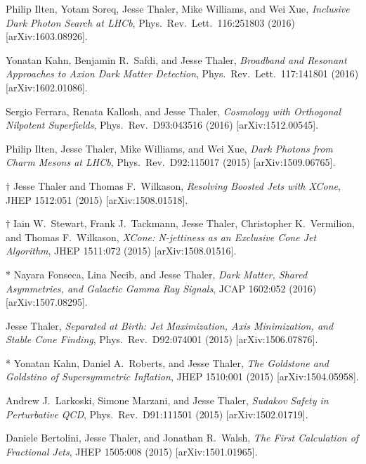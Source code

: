 \begin{list}{[]\addtocounter{jessecount}{-1}}{\leftmargin=3em \itemsep=4pt}
\item
 Philip Ilten, Yotam Soreq, Jesse Thaler, Mike Williams, and Wei Xue,
\emph{Inclusive Dark Photon Search at LHCb},
Phys.\ Rev.\ Lett.\ 116:251803 (2016)
[arXiv:1603.08926].

\item
 Yonatan Kahn, Benjamin R.\ Safdi, and Jesse Thaler,
\emph{Broadband and Resonant Approaches to Axion Dark Matter Detection},
Phys.\ Rev.\ Lett.\ 117:141801 (2016)
[arXiv:1602.01086].

\item
 Sergio Ferrara, Renata Kallosh, and Jesse Thaler,
\emph{Cosmology with Orthogonal Nilpotent Superfields},
Phys.\ Rev.\ D93:043516 (2016)
[arXiv:1512.00545].

\item
 Philip Ilten, Jesse Thaler, Mike Williams, and Wei Xue,
\emph{Dark Photons from Charm Mesons at LHCb},
Phys.\ Rev.\ D92:115017 (2015)
[arXiv:1509.06765].

\item
$\dagger$ Jesse Thaler and Thomas F.\ Wilkason,
\emph{Resolving Boosted Jets with XCone},
JHEP 1512:051 (2015)
[arXiv:1508.01518].

\item
$\dagger$ Iain W.\ Stewart, Frank J.\ Tackmann, Jesse Thaler, Christopher K.\ Vermilion, and Thomas F.\ Wilkason,
\emph{XCone: N-jettiness as an Exclusive Cone Jet Algorithm},
JHEP 1511:072 (2015)
[arXiv:1508.01516].

\item
* Nayara Fonseca, Lina Necib, and Jesse Thaler,
\emph{Dark Matter, Shared Asymmetries, and Galactic Gamma Ray Signals},
JCAP 1602:052 (2016)
[arXiv:1507.08295].

\item
 Jesse Thaler,
\emph{Separated at Birth: Jet Maximization, Axis Minimization, and Stable Cone Finding},
Phys.\ Rev.\ D92:074001 (2015)
[arXiv:1506.07876].

\item
* Yonatan Kahn, Daniel A.\ Roberts, and Jesse Thaler,
\emph{The Goldstone and Goldstino of Supersymmetric Inflation},
JHEP 1510:001 (2015)
[arXiv:1504.05958].

\item
 Andrew J.\ Larkoski, Simone Marzani, and Jesse Thaler,
\emph{Sudakov Safety in Perturbative QCD},
Phys.\ Rev.\ D91:111501 (2015)
[arXiv:1502.01719].

\item
 Daniele Bertolini, Jesse Thaler, and Jonathan R.\ Walsh,
\emph{The First Calculation of Fractional Jets},
JHEP 1505:008 (2015)
[arXiv:1501.01965].


\end{list}
